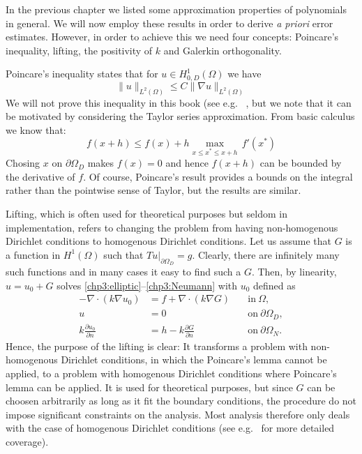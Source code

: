 In the previous chapter we listed some approximation properties of polynomials in general. We will now employ these results in order to
derive \emph{a priori} error estimates. However, in order to achieve this we need four concepts: Poincare's inequality, lifting, the positivity of $k$
and Galerkin orthogonality. 

Poincare's inequality states that for $u\in  H^1_{0, D}(\Omega)$ we have
\begin{equation} 
\label{poincare}
\|u\|_{L^2(\Omega)}  \le C \| \nabla u\|_{L^2(\Omega)} 
\end{equation} 
We will not prove this inequality in this book (see e.g. ~\cite{evans2022partial},  
but we note that it can be motivated by considering the Taylor series approximation. 
From basic calculus we know that: 
\[
f(x+h) \le f(x) + h \max_{x \le x^* \le x+h } \,  f'(x^*) 
\]
Chosing $x$ on $\partial \Omega_D$ makes $f(x)=0$ and hence $f(x+h)$ can be bounded by the derivative
of $f$. Of course, Poincare's result provides a bounds on the integral rather than the pointwise sense 
of Taylor, but the results are similar. 

Lifting, which is often used for theoretical purposes but seldom in implementation, 
refers to changing the problem from having non-homogenous Dirichlet conditions to homogenous Dirichlet conditions.  
Let us assume that $G$ is a function in $H^1(\Omega)$ such that $T u |_{\partial \Omega_D} = g$. 
Clearly, there are infinitely many such functions and in many cases it easy to find such a $G$. 
Then, by linearity, 
$u= u_0 + G$ solves \eqref{chp3:elliptic}--\eqref{chp3:Neumann} with $u_0$ defined as     
\begin{eqnarray}
\label{chp3:elliptic:lift}
-\nabla\cdot(k\nabla u_0 )  &= f +\nabla\cdot(k\nabla G)  &\quad \textrm{in}\ \Omega,\\
\label{chp3:Dirichlet:lift}
u&= 0 &\quad \textrm{on}\ \partial\Omega_D, \\
\label{chp3:Neumann:lift}
k \frac{\partial u_0}{\partial n}&= h - k \frac{\partial G}{\partial n} &\quad \textrm{on}\ \partial\Omega_N . 
\end{eqnarray}
Hence, the purpose of the lifting is clear: It transforms a problem with non-homogenous Dirichlet conditions, in which the Poincare's lemma
cannot be applied, to a problem with homogenous Dirichlet conditions where Poincare's lemma can be applied. It is used for theoretical purposes, 
but since $G$ can be choosen arbitrarily as long as it fit the boundary conditions, the procedure do not impose significant constraints on
the analysis. Most analysis therefore only deals with the case of homogenous Dirichlet conditions (see e.g.~\cite{braess2007finite} for more 
detailed coverage). 

